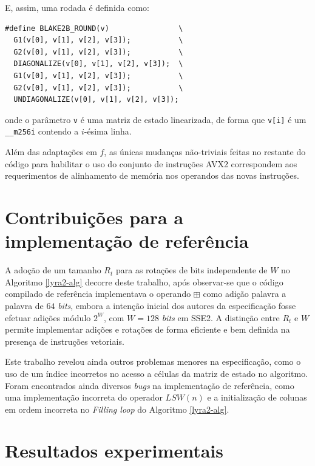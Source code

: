\documentclass{article}
\begin{document}
E, assim, uma rodada é definida como:

\begin{small}
\begin{verbatim}
#define BLAKE2B_ROUND(v)                \
  G1(v[0], v[1], v[2], v[3]);           \
  G2(v[0], v[1], v[2], v[3]);           \
  DIAGONALIZE(v[0], v[1], v[2], v[3]);  \
  G1(v[0], v[1], v[2], v[3]);           \
  G2(v[0], v[1], v[2], v[3]);           \
  UNDIAGONALIZE(v[0], v[1], v[2], v[3]);
\end{verbatim}
\end{small}
onde o parâmetro \texttt{v} é uma matriz de estado linearizada, de forma
que \texttt{v[i]} é um \texttt{\_\_m256i} contendo a $i$-ésima linha.

Além das adaptações em $f$, as únicas mudanças não-triviais feitas no restante
do código para habilitar o uso do conjunto de instruções AVX2 correspondem aos
requerimentos de alinhamento de memória nos operandos das novas instruções.

\section{Contribuições para a implementação de referência }
\label{sec-contribuicoes}

A adoção de um tamanho $R_{t}$ para as rotações de bits independente de $W$ no
Algoritmo \ref{lyra2-alg} decorre deste trabalho, após observar-se que o código
compilado de referência implementava o operando $\boxplus$ como adição palavra
a palavra de $64$ \emph{bits}, embora a intenção inicial dos autores da
especificação fosse efetuar adições módulo $2^{W}$, com $W = 128$ \emph{bits}
em SSE2. A distinção entre $R_{t}$ e $W$ permite implementar adições e rotações
de forma eficiente e bem definida na presença de instruções vetoriais.

Este trabalho revelou ainda outros problemas menores na especificação, como o
uso de um índice incorretos no acesso a células da matriz de estado no
algoritmo. Foram encontrados ainda diversos \emph{bugs} na implementação de
referência, como uma implementação incorreta do operador $LSW(n)$ e a
initialização de colunas em ordem incorreta no \emph{Filling loop} do Algoritmo
\ref{lyra2-alg}.

\section{Resultados experimentais }
\label{sec-experimental}
\end{document}
